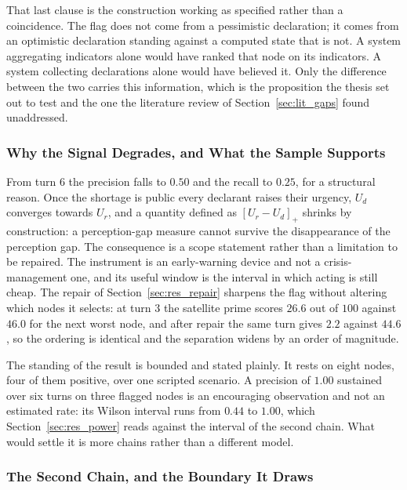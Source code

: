 That last clause is the construction working as specified rather than a coincidence. The
flag does not come from a pessimistic declaration; it comes from an optimistic declaration
standing against a computed state that is not. A system aggregating indicators alone would
have ranked that node on its indicators. A system collecting declarations alone would have
believed it. Only the difference between the two carries this information, which is the
proposition the thesis set out to test and the one the literature review of
Section~\ref{sec:lit_gaps} found unaddressed.

\subsubsection{Why the Signal Degrades, and What the Sample Supports}

From turn 6 the precision falls to $0.50$ and the recall to $0.25$, for a structural reason.
Once the shortage is public every declarant raises their urgency, $U_d$ converges towards
$U_r$, and a quantity defined as $[U_r - U_d]_+$ shrinks by construction: a perception-gap
measure cannot survive the disappearance of the perception gap. The consequence is a scope
statement rather than a limitation to be repaired. The instrument is an early-warning device
and not a crisis-management one, and its useful window is the interval in which acting is
still cheap. The repair of Section~\ref{sec:res_repair} sharpens the flag without altering
which nodes it selects: at turn 3 the satellite prime scores $26.6$ out of $100$ against
$46.0$ for the next worst node, and after repair the same turn gives $2.2$ against $44.6$,
so the ordering is identical and the separation widens by an order of magnitude.

The standing of the result is bounded and stated plainly. It rests on eight nodes, four of
them positive, over one scripted scenario. A precision of $1.00$ sustained over six turns on
three flagged nodes is an encouraging observation and not an estimated rate: its Wilson
interval runs from $0.44$ to $1.00$, which Section~\ref{sec:res_power} reads against the
interval of the second chain. What would settle it is
more chains rather than a different model.

\subsubsection{The Second Chain, and the Boundary It Draws}
\label{sec:res_second_chain}

